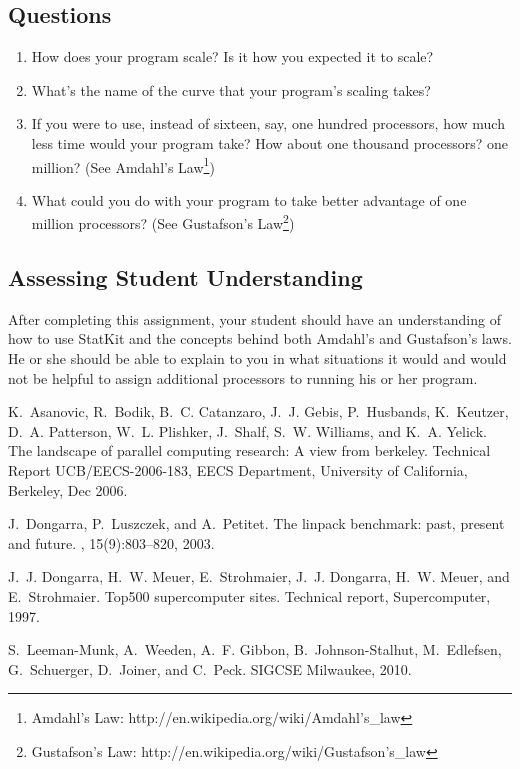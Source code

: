 \documentclass[12pt]{article}
\begin{document}
\subsection{Questions}
\begin{enumerate}
\item How does your program scale? Is it how you expected it to scale?
\item What's the name of the curve that your program's scaling takes?
\item If you were to use, instead of sixteen, say, one hundred processors, how much less time would your program take? How about one thousand processors? one million? (See Amdahl's Law\footnote{Amdahl's Law: http://en.wikipedia.org/wiki/Amdahl's\_law})
\item What could you do with your program to take better advantage of one million processors? (See Gustafson's Law\footnote{Gustafson's Law: http://en.wikipedia.org/wiki/Gustafson's\_law})
\end{enumerate}
\subsection{Assessing Student Understanding}
After completing this assignment, your student should have an understanding of how to use StatKit and the concepts behind both Amdahl's and Gustafson's laws. He or she should be able to explain to you in what situations it would and would not be helpful to assign additional processors to running his or her program.

\begin{thebibliography}{1}

K.~Asanovic, R.~Bodik, B.~C. Catanzaro, J.~J. Gebis, P.~Husbands, K.~Keutzer,
  D.~A. Patterson, W.~L. Plishker, J.~Shalf, S.~W. Williams, and K.~A. Yelick.
\newblock The landscape of parallel computing research: A view from berkeley.
\newblock Technical Report UCB/EECS-2006-183, EECS Department, University of
  California, Berkeley, Dec 2006.

J.~Dongarra, P.~Luszczek, and A.~Petitet.
\newblock The linpack benchmark: past, present and future.
,
  15(9):803--820, 2003.

J.~J. Dongarra, H.~W. Meuer, E.~Strohmaier, J.~J. Dongarra, H.~W. Meuer, and
  E.~Strohmaier.
\newblock Top500 supercomputer sites.
\newblock Technical report, Supercomputer, 1997.

S.~Leeman-Munk, A.~Weeden, A.~F. Gibbon, B.~Johnson-Stalhut, M.~Edlefsen,
  G.~Schuerger, D.~Joiner, and C.~Peck.
\newblock SIGCSE Milwaukee, 2010.

\end{thebibliography}
\end{document}

